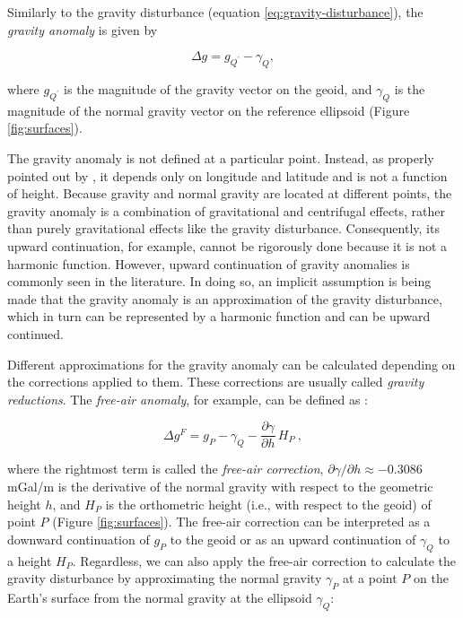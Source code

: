 \documentclass[manuscript]{geophysics}
\begin{document}
Similarly to the gravity disturbance (equation \ref{eq:gravity-disturbance}),
the \textit{gravity anomaly} is given by

\begin{equation}
\Delta g = g_{Q^{\prime}} - \gamma_{Q} ,
\label{eq:gravity-anomaly}
\end{equation}

\noindent
where $g_{Q^{\prime}}$ is the magnitude of the gravity vector on the geoid,
and $\gamma_{Q}$ is the magnitude of the normal gravity vector
on the reference ellipsoid (Figure \ref{fig:surfaces}).

The gravity anomaly is not defined at a particular point.
Instead, as properly pointed out by \citet{barthelmes2013},
it depends only on longitude and latitude and is not a function of height.
Because gravity and normal gravity are located at different points,
the gravity anomaly is a combination of gravitational and centrifugal effects,
rather than purely gravitational effects like the gravity disturbance.
Consequently, its upward continuation, for example, cannot be rigorously done
because it is not a harmonic function.
However, upward continuation of gravity anomalies is commonly seen in the
literature.
In doing so, an implicit assumption is being made that the gravity anomaly is
an approximation of the gravity disturbance,
which in turn can be represented by a harmonic function and can be upward
continued.

Different approximations for the gravity anomaly can be calculated
depending on the corrections applied to them.
These corrections are usually called \textit{gravity reductions}.
The \textit{free-air anomaly}, for example, can be defined as
\citep{blakely1996, hofmann-wellenhof-moritz2005}:

\begin{equation}
\Delta g^{F} = g_{P}
- \gamma_{Q} - \frac{\partial \gamma}{\partial h} \, H_{P} \: ,
\label{eq:free-air-anomaly}
\end{equation}

\noindent
where the rightmost term is called the \textit{free-air correction},
$\partial \gamma/\partial h \approx -0.3086$ mGal/m is the
derivative of the normal gravity with respect to the geometric height $h$,
and $H_{P}$ is the orthometric height (i.e., with respect to the geoid)
of point $P$ (Figure \ref{fig:surfaces}).
The free-air correction can be interpreted as a downward continuation of
$g_P$ to the geoid or as an upward continuation of $\gamma_Q$ to a height
$H_P$.
Regardless, we can also apply the free-air correction
to calculate the gravity disturbance by
approximating the normal gravity $\gamma_{P}$
at a point $P$ on the Earth's surface
from the normal gravity at the ellipsoid $\gamma_{Q}$:
\end{document}
